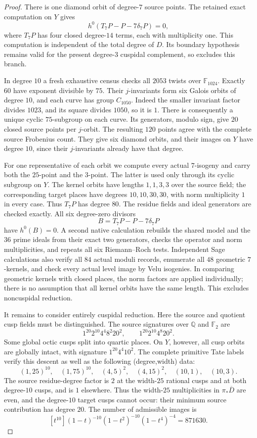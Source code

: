 \begin{proof}
There is one diamond orbit of degree-$7$ source points. The
retained exact computation on $Y$ gives
\[
 h^0(T_7P-P-7\delta_7P)=0,
\]
where $T_7P$ has four closed degree-$14$ terms, each with
multiplicity one. This computation is independent of the total
degree of $D$. Its boundary hypothesis remains valid for the
present degree-$3$ cuspidal complement, so excludes this branch.

In degree $10$ a fresh exhaustive census checks all $2053$
twists over $\mathbb F_{1024}$. Exactly $60$ have exponent
divisible by $75$. Their $j$-invariants form six Galois orbits
of degree $10$, and each curve has group $C_{1050}$. Indeed the
smaller invariant factor divides $1023$, and its square divides
$1050$, so it is $1$. There is consequently a unique cyclic
$75$-subgroup on each curve. Its generators, modulo sign, give
$20$ closed source points per $j$-orbit. The resulting $120$
points agree with the complete source Frobenius count.
They give six diamond orbits, and their images on $Y$ have
degree $10$, since their $j$-invariants already have that degree.

For one representative of each orbit we compute every actual
$7$-isogeny and carry both the $25$-point and the $3$-point.
The latter is used only through its cyclic subgroup on $Y$.
The kernel orbits have lengths $1,1,3,3$ over the source field;
the corresponding target places have degrees $10,10,30,30$,
with norm multiplicity $1$ in every case. Thus $T_7P$ has degree
$80$. The residue fields and ideal generators are checked
exactly. All six degree-zero divisors
\[
 B=T_7P-P-7\delta_7P
\]
have $h^0(B)=0$. A second native calculation rebuilds the
shared model and the $36$ prime ideals from their exact two
generators, checks the operator and norm multiplicities, and
repeats all six Riemann--Roch tests. Independent Sage calculations
also verify all $84$ actual moduli records, enumerate all $48$
geometric $7$-kernels, and check every actual level image by
Velu isogenies. In comparing geometric kernels with closed
places, the norm factors are applied individually; there is no
assumption that all kernel orbits have the same length.
This excludes noncuspidal reduction.

It remains to consider entirely cuspidal reduction. Here the
source and quotient cusp fields must be distinguished. The
source signatures over $\mathbb Q$ and $\mathbb F_2$ are
\[
 1^{20}2^{10}4^4 8^2 20^2,\qquad
 1^{20}2^{10}4^8 20^2.
\]
Some global octic cusps split into quartic places. On $Y$,
however, all cusp orbits are globally intact, with signature
$1^{20}4^4 10^2$. The complete primitive Tate labels verify
this descent as well as the following (degree,width) data:
\[
 (1,25)^{10},\quad(1,75)^{10},\quad
 (4,5)^2,\quad(4,15)^2,\quad(10,1),\quad(10,3).
\]
The source residue-degree factor is $2$ at the width-$25$
rational cusps and at both degree-$10$ cusps, and is $1$
elsewhere. Thus the width-$25$ multiplicities in
$\pi_*\overline D$ are even, and the degree-$10$ target cusps
cannot occur: their minimum source contribution has degree
$20$. The number of admissible images is
\[
 [t^{10}](1-t)^{-10}(1-t^2)^{-10}(1-t^4)^{-4}=871630.
\]


\end{proof}
